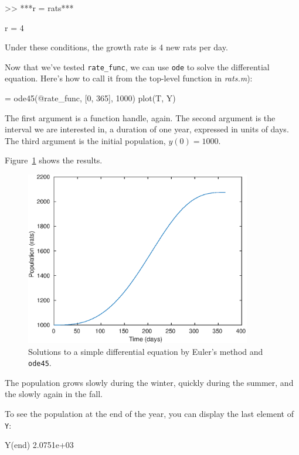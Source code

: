 \begin{code}
>> ***r = rats***

r = 4
\end{code}

Under these conditions, the growth rate is 4 new rats per day. 

Now that we've tested \verb"rate_func", we can use {\tt ode} to solve the differential equation.
Here's how to call it from the top-level function in {\em rats.m}):

\begin{code}
[T, Y] = ode45(@rate_func, [0, 365], 1000)
plot(T, Y)
\end{code}

The first argument is a function handle, again.  The second argument is the interval we are interested
in, a duration of one year, expressed in units of days.
The third argument is the initial population, $y(0) = 1000$.


Figure~\ref{fig:rats} shows the results. 

\begin{figure}[ht]
\centerline{\includegraphics[height=3in]{book/figs/rats.eps}}
\caption{Solutions to a simple differential equation by Euler's method and {\tt ode45}.}
\label{fig:rats}
\end{figure}

The population grows slowly during the winter, quickly during the summer, and the slowly again in the fall.


To see the population at the end of the year, you can display the last element of {\tt Y}:

\begin{code}
Y(end)
2.0751e+03
\end{code}

